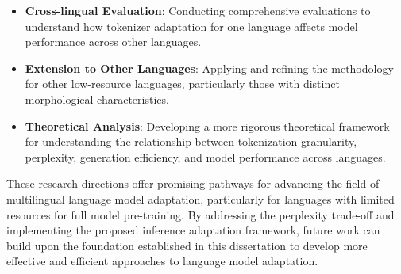 \begin{itemize}
    \item \textbf{Cross-lingual Evaluation}: Conducting comprehensive evaluations to understand how tokenizer adaptation for one language affects model performance across other languages.
    
    \item \textbf{Extension to Other Languages}: Applying and refining the methodology for other low-resource languages, particularly those with distinct morphological characteristics.
    
    \item \textbf{Theoretical Analysis}: Developing a more rigorous theoretical framework for understanding the relationship between tokenization granularity, perplexity, generation efficiency, and model performance across languages.
\end{itemize}

These research directions offer promising pathways for advancing the field of multilingual language model adaptation, particularly for languages with limited resources for full model pre-training. By addressing the perplexity trade-off and implementing the proposed inference adaptation framework, future work can build upon the foundation established in this dissertation to develop more effective and efficient approaches to language model adaptation.

